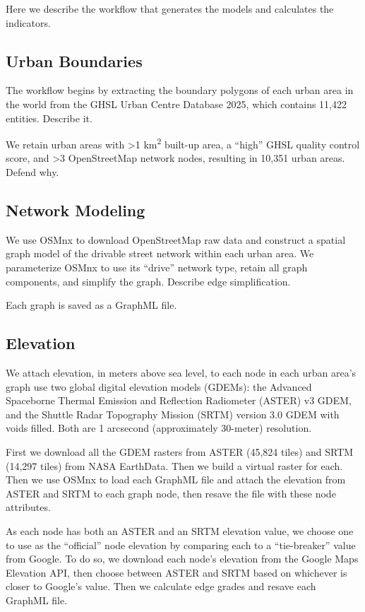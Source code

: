 \documentclass[12pt,letterpaper]{article} %
\begin{document}
Here we describe the workflow that generates the models and calculates the indicators.

\subsection{Urban Boundaries}

The workflow begins by extracting the boundary polygons of each urban area in the world from the GHSL Urban Centre Database 2025, which contains 11,422 entities. Describe it.

We retain urban areas with >1 km\textsuperscript{2} built-up area, a \enquote{high} GHSL quality control score, and >3 OpenStreetMap network nodes, resulting in 10,351 urban areas. Defend why.

\subsection{Network Modeling}

We use OSMnx to download OpenStreetMap raw data and construct a spatial graph model of the drivable street network within each urban area. We parameterize OSMnx to use its \enquote{drive} network type, retain all graph components, and simplify the graph. Describe edge simplification.

Each graph is saved as a GraphML file.

\subsection{Elevation}

We attach elevation, in meters above sea level, to each node in each urban area's graph use two global digital elevation models (GDEMs): the Advanced Spaceborne Thermal Emission and Reflection Radiometer (ASTER) v3 GDEM, and the Shuttle Radar Topography Mission (SRTM) version 3.0 GDEM with voids filled.
Both are 1 arcsecond (approximately 30-meter) resolution.

First we download all the GDEM rasters from ASTER (45,824 tiles) and SRTM (14,297 tiles) from NASA EarthData. Then we build a virtual raster for each. Then we use OSMnx to load each GraphML file and attach the elevation from ASTER and SRTM to each graph node, then resave the file with these node attributes.

As each node has both an ASTER and an SRTM elevation value, we choose one to use as the \enquote{official} node elevation by comparing each to a \enquote{tie-breaker} value from Google. To do so, we download each node's elevation from the Google Maps Elevation API, then choose between ASTER and SRTM based on whichever is closer to Google's value. Then we calculate edge grades and resave each GraphML file.
\end{document}

